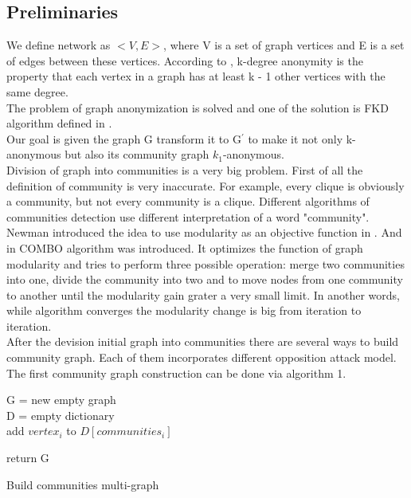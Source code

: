 \documentclass[conference]{IEEEtran}
\begin{document}
\subsection{Preliminaries}
	We define network as $<V, E>$, where V is a set of graph vertices and E is a set of edges between these vertices.
	According to \cite{cheng2010k}, k-degree anonymity is the property that each vertex in a graph has at least k - 1 other vertices with the same degree.\\
	The problem of graph anonymization is solved and one of the solution is FKD algorithm defined in \cite{lu2012fast}.\\
	Our goal is given the graph G transform it to G$^\prime$ to make it not only k-anonymous but also its community graph $k_1$-anonymous.\\
	Division of graph into communities is a very big problem. First of all the definition of community is very inaccurate. For example, every clique is obviously a community, but not every community is a clique. Different algorithms of communities detection use different interpretation of a word "community". Newman introduced the idea to use modularity as an objective function in \cite{newman2012communities}. And in \cite{sobolevsky2014general} COMBO algorithm was introduced. It optimizes the function of graph modularity and tries to perform three possible operation: merge two communities into one, divide the community into two and to move nodes from one community to another until the modularity gain grater a very small limit. In another words, while algorithm converges the modularity change is big from iteration to iteration.\\
	After the devision initial graph into communities there are several ways to build community graph. Each of them incorporates different opposition attack model. The first community graph construction can be done via algorithm 1.
	
	\begin{algorithm}
		G = new empty graph\\
		D = empty dictionary\\

		 {
			add $vertex_i$ to $D[communities_i ]$\\
		}
		
		
		return G
		\caption{Build communities multi-graph}
	\end{algorithm}
	
\end{document}
